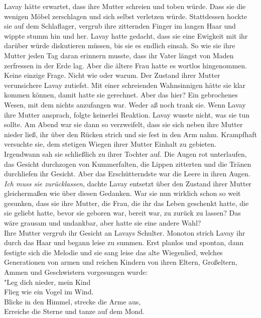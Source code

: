 Lavay hätte erwartet, dass ihre Mutter schreien und toben würde. Dass sie die wenigen Möbel 
zerschlagen und sich selbst verletzen würde. Stattdessen hockte sie auf dem Schlaflager, vergrub 
ihre zitternden Finger im langen Haar und wippte stumm hin und her. Lavay hatte gedacht, dass sie 
eine Ewigkeit mit ihr darüber würde diskutieren müssen, bis sie es endlich einsah. So wie sie 
ihre Mutter jeden Tag daran erinnern musste, dass ihr Vater längst von Maden zerfressen in der Erde 
lag. Aber die ältere Frau hatte es wortlos hingenommen. Keine einzige Frage. Nicht wie oder warum. 
Der Zustand ihrer Mutter verunsichere Lavay zutiefst. Mit einer schreienden Wahnsinnigen hätte sie 
klar kommen können, damit hatte sie gerechnet. Aber das hier? Ein gebrochenes Wesen, mit dem nichts 
anzufangen war. Weder aß noch trank sie. Wenn Lavay ihre Mutter ansprach, folgte keinerlei 
Reaktion. Lavay wusste nicht, was sie tun sollte. Am Abend war sie dann so verzweifelt, dass sie 
sich neben ihre Mutter nieder ließ, ihr über den Rücken strich und sie fest in den Arm nahm. 
Krampfhaft versuchte sie, dem stetigen Wiegen ihrer Mutter Einhalt zu gebieten. \\
Irgendwann sah sie schließlich zu ihrer Tochter auf. Die Augen rot unterlaufen, das Gesicht 
durchzogen von Kummerfalten, die Lippen zitterten und die Tränen durchliefen ihr Gesicht. Aber das 
Erschütterndste war die Leere in ihren Augen. \\
\textit{Ich muss sie zurücklassen}, dachte Lavay entsetzt über den Zustand ihrer Mutter 
gleichermaßen wie über diesen Gedanken. War sie nun wirklich schon so weit gesunken, dass sie ihre 
Mutter, die Frau, die ihr das Leben geschenkt hatte, die sie geliebt hatte, bevor sie 
geboren war, bereit war, zu zurück zu lassen? Das wäre grausam und undankbar, aber hatte sie eine 
andere Wahl? \\
Ihre Mutter vergrub ihr Gesicht an Lavays Schulter. Monoton strich Lavay ihr durch 
das Haar und begann leise zu summen. Erst planlos und spontan, dann festigte sich die Melodie und 
sie sang leise das alte Wiegenlied, welches Generationen von armen und reichen Kindern von ihren 
Eltern, Großeltern, Ammen und Geschwistern vorgesungen wurde:\\
"Leg dich nieder, mein Kind\\
Flieg wie ein Vogel im Wind.\\
Blicke in den Himmel, strecke die Arme aus,\\
Erreiche die Sterne und tanze auf dem Mond.\\
